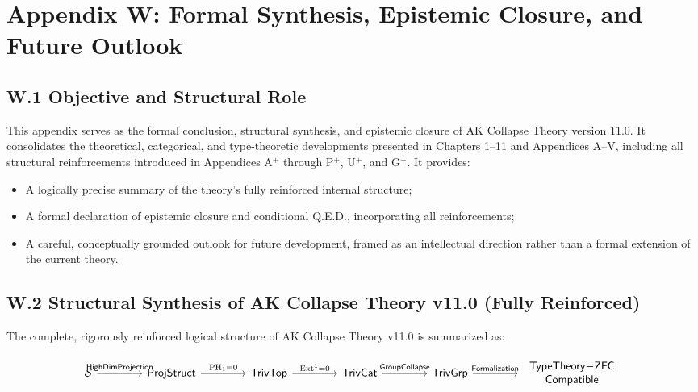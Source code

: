 \documentclass[11pt]{article}
\begin{document}
\section*{Appendix W: Formal Synthesis, Epistemic Closure, and Future Outlook}

\subsection*{W.1 Objective and Structural Role}

This appendix serves as the formal conclusion, structural synthesis, and epistemic closure of AK Collapse Theory version 11.0.  
It consolidates the theoretical, categorical, and type-theoretic developments presented in Chapters 1–11 and Appendices A–V, including all structural reinforcements introduced in Appendices A$^{+}$ through P$^{+}$, U$^{+}$, and G$^{+}$.  
It provides:

\begin{itemize}
    \item A logically precise summary of the theory's fully reinforced internal structure;
    \item A formal declaration of epistemic closure and conditional Q.E.D., incorporating all reinforcements;
    \item A careful, conceptually grounded outlook for future development, framed as an intellectual direction rather than a formal extension of the current theory.
\end{itemize}

\subsection*{W.2 Structural Synthesis of AK Collapse Theory v11.0 (Fully Reinforced)}

The complete, rigorously reinforced logical structure of AK Collapse Theory v11.0 is summarized as:

\[
\begin{tikzcd}[column sep=4em, row sep=3em]
\mathcal{S} \arrow[r, "\mathsf{HighDimProjection}"]
& \mathsf{ProjStruct} \arrow[r, "\mathrm{PH}_1 = 0"]
& \mathsf{TrivTop} \arrow[r, "\mathrm{Ext}^1 = 0"]
& \mathsf{TrivCat} \arrow[r, "\mathsf{GroupCollapse}"]
& \mathsf{TrivGrp} \arrow[r, "\mathsf{Formalization}"]
& {\begin{tabular}{c}
\(\mathsf{TypeTheory{-}ZFC}\) \\
\(\mathsf{Compatible}\)
\end{tabular}}
\end{tikzcd}
\]
\end{document}
